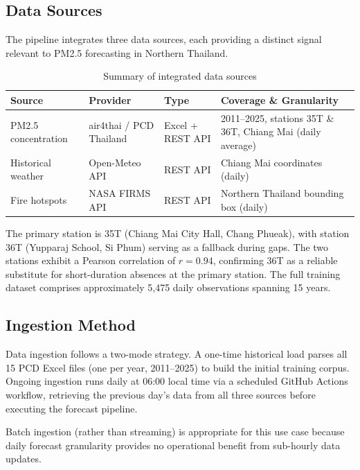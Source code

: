 \documentclass[12pt,a4paper]{report}
\begin{document}
\subsection{Data Sources}

The pipeline integrates three data sources, each providing a distinct signal relevant to PM2.5 forecasting in Northern Thailand.

\begin{table}[H]
\centering
\caption{Summary of integrated data sources}
\label{tab:data_sources}
\begin{tabularx}{\textwidth}{@{}p{3cm}p{3cm}p{2cm}X@{}}
\toprule
\textbf{Source} & \textbf{Provider} & \textbf{Type} & \textbf{Coverage \& Granularity} \\
\midrule
PM2.5 concentration & air4thai / PCD Thailand & Excel + REST API & 2011--2025, stations 35T \& 36T, Chiang Mai (daily average) \\[4pt]
Historical weather   & Open-Meteo API          & REST API         & Chiang Mai coordinates (daily) \\[4pt]
Fire hotspots        & NASA FIRMS API          & REST API         & Northern Thailand bounding box (daily) \\
\bottomrule
\end{tabularx}
\end{table}

The primary station is 35T (Chiang Mai City Hall, Chang Phueak), with station 36T (Yupparaj School, Si Phum) serving as a fallback during gaps. The two stations exhibit a Pearson correlation of $r = 0.94$, confirming 36T as a reliable substitute for short-duration absences at the primary station. The full training dataset comprises approximately 5,475 daily observations spanning 15 years.

\subsection{Ingestion Method}

Data ingestion follows a two-mode strategy. A one-time historical load parses all 15 PCD Excel files (one per year, 2011--2025) to build the initial training corpus. Ongoing ingestion runs daily at 06:00 local time via a scheduled GitHub Actions workflow, retrieving the previous day's data from all three sources before executing the forecast pipeline.

Batch ingestion (rather than streaming) is appropriate for this use case because daily forecast granularity provides no operational benefit from sub-hourly data updates.
\end{document}
